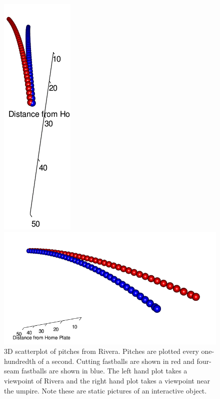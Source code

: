 \begin{article}
\begin{figure}[h]
\begin{minipage}[t]{0.45\textwidth}%
\centerline{\includegraphics[scale = .45]{rgl_b.png}}%
\end{minipage}\hspace*{\fill}%
\begin{minipage}[t]{0.45\textwidth}%
\centerline{\includegraphics[scale = .45]{rgl_a.png}}%
\end{minipage}

\caption{3D scatterplot of pitches from Rivera. Pitches are plotted every one-hundredth
of a second. Cutting fastballs are shown in red and four-seam fastballs
are shown in blue. The left hand plot takes a viewpoint of Rivera
and the right hand plot takes a viewpoint near the umpire. Note these
are static pictures of an interactive object. \label{fig:rgl}}
\end{figure}

\end{article}
